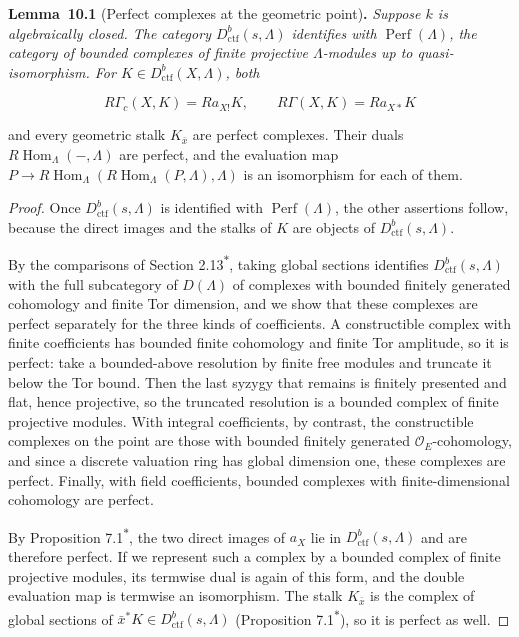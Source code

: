 \documentclass[11pt]{article}
\newenvironment{bpstatement}[2]{\par\addvspace{0.6\baselineskip}\noindent\textbf{#1}#2\textbf{.}\enspace\ignorespaces}
  {\par\addvspace{0.4\baselineskip}}
\newenvironment{bpstatementit}[2]{\begin{bpstatement}{#1}{#2}\itshape\ignorespaces}{\end{bpstatement}}
\newcommand{\bpout}[1]{#1\textsuperscript{\hyperlink{bp-outside}{\ensuremath{\ast}}}}
\begin{document}
\label{bp5}%
\begin{bpstatementit}{Lemma~10.1}{ (Perfect complexes at the geometric point)}
Suppose \(k\) is algebraically closed. The category \(D^b_{\mathrm{ctf}}(s,\Lambda)\) identifies with \(\operatorname{Perf}(\Lambda)\), the category of bounded complexes of finite projective \(\Lambda\)-modules up to quasi-isomorphism. For \(K\in D^b_{\mathrm{ctf}}(X,\Lambda)\), both

\[
R\Gamma_c(X,K)=Ra_{X!}K,\qquad R\Gamma(X,K)=Ra_{X*}K
\]

and every geometric stalk \(K_{\bar x}\) are perfect complexes. Their duals \(R\!\operatorname{Hom}_\Lambda(-,\Lambda)\) are perfect, and the evaluation map \(P\to R\!\operatorname{Hom}_\Lambda(R\!\operatorname{Hom}_\Lambda(P,\Lambda),
\Lambda)\) is an isomorphism for each of them.
\end{bpstatementit}

\begin{proof}[{Proof}]\label{bp6}%
Once \(D^b_{\mathrm{ctf}}(s,\Lambda)\) is identified with \(\operatorname{Perf}(\Lambda)\), the other assertions follow, because the direct images and the stalks of \(K\) are objects of \(D^b_{\mathrm{ctf}}(s,\Lambda)\).

By the comparisons of Section \bpout{2.13}, taking global sections identifies \(D^b_{\mathrm{ctf}}(s,\Lambda)\) with the full subcategory of \(D(\Lambda)\) of complexes with bounded finitely generated cohomology and finite Tor dimension, and we show that these complexes are perfect separately for the three kinds of coefficients. A constructible complex with finite coefficients has bounded finite cohomology and finite Tor amplitude, so it is perfect: take a bounded-above resolution by finite free modules and truncate it below the Tor bound. Then the last syzygy that remains is finitely presented and flat, hence projective, so the truncated resolution is a bounded complex of finite projective modules. With integral coefficients, by contrast, the constructible complexes on the point are those with bounded finitely generated \(\mathcal O_E\)-cohomology, and since a discrete valuation ring has global dimension one, these complexes are perfect. Finally, with field coefficients, bounded complexes with finite-dimensional cohomology are perfect.

By Proposition \bpout{7.1}, the two direct images of \(a_X\) lie in \(D^b_{\mathrm{ctf}}(s,\Lambda)\) and are therefore perfect. If we represent such a complex by a bounded complex of finite projective modules, its termwise dual is again of this form, and the double evaluation map is termwise an isomorphism. The stalk \(K_{\bar x}\) is the complex of global sections of \(\bar x^*K\in D^b_{\mathrm{ctf}}(s,\Lambda)\) (Proposition \bpout{7.1}), so it is perfect as well.
\end{proof}
\end{document}
